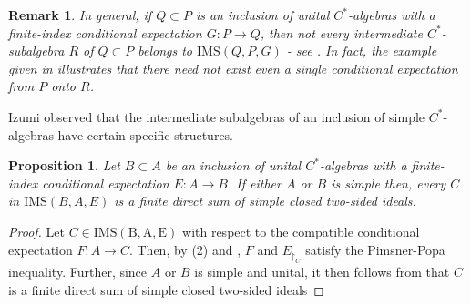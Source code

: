 \documentclass[a4]{amsart}
\newtheorem{proposition}[theorem]{\bf Proposition}
\newtheorem{remark}[theorem]{\bf Remark}
\numberwithin{equation}{section}
\begin{document}
 
\begin{remark}
 In general, if $Q \subset P$ is an inclusion of unital
  $C^*$-algebras with a finite-index conditional expectation $G: P \to
  Q$, then not every intermediate $C^*$-subalgebra $R$ of $Q \subset P$
  belongs to $\mathrm{IMS}(Q,P, G)$ - see \cite[Example 2.5]{IW}. In
  fact, the example given in \cite{IW} illustrates that there need not 
  exist even a single conditional expectation from $P$ onto $R$.
  \end{remark}
Izumi observed that the intermediate subalgebras of an inclusion of simple $C^*$-algebras have certain specific structures.
\begin{proposition}\cite{Izumi}\label{intermediate-structure}
  Let $B \subset A$ be an inclusion of unital $C^*$-algebras with a
  finite-index conditional expectation $E: A \to B$. If either $A$ or $B$ is simple then, 
 every $C$ in $\mathrm{IMS}(B, A, E)$ is a finite direct sum of simple closed two-sided ideals.
\end{proposition}
\begin{proof}
Let $C \in \mathrm{IMS(B,A,E)}$ with respect to the compatible
conditional expectation $F: A\to C$.  Then, by (2) and
\cite[Proposition 2.1.5]{Wat}, $F$ and $ E_{\restriction_C }$ satisfy the Pimsner-Popa
inequality. Further, since $A$ or $B$ is simple and unital, it
then follows from \cite[Theorem 3.3]{Izumi} that $C$ is a finite direct sum
of simple closed two-sided ideals
\end{proof}
\end{document}
